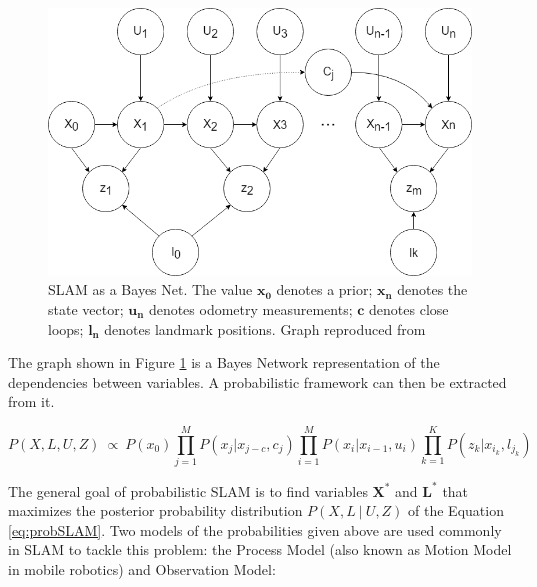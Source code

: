 \documentclass[11pt]{article}
\begin{document}
\begin{figure}
\begin{minipage}{0.65\textwidth}
\centering
\includegraphics[width=\textwidth]{BayesNetSLAM}
\end{minipage} \hfill
\begin{minipage}{0.35\textwidth}
\centering
\caption{SLAM as a Bayes Net. The value $\mathbf{x_0}$ denotes a prior; $\mathbf{x_n}$ denotes the state vector; $\mathbf{u_n}$ denotes odometry measurements; $\mathbf{c}$ denotes close loops; $\mathbf{l_n}$ denotes landmark positions. Graph reproduced from \cite{Kaess08tro}}
\label{fig:slam1}
\end{minipage}				
\end{figure}
	
The graph shown in Figure \ref{fig:slam1} is a Bayes Network representation of the dependencies between variables. A probabilistic framework can then be extracted from it. 

\begin{equation}
P(X,L,U,Z)\ \propto \ P(x_0)\prod_{j=1}^{M}P(x_j|x_{j-c},c_j)\prod_{i=1}^{M}P(x_i|x_{i-1}, u_i)\prod_{k=1}^{K}P(z_k|x_{i_k},l_{j_k})
\label{eq:probSLAM}
\end{equation}

The general goal of probabilistic SLAM is to find variables $\mathbf{X^*}$ and $\mathbf{L^*}$ that maximizes the posterior probability distribution $P(X,L\ |\ U, Z)$ of the Equation \ref{eq:probSLAM}. Two models of the probabilities given above are used commonly in SLAM to tackle this problem: the Process Model (also known as Motion Model in mobile robotics) and Observation Model:
\end{document}
